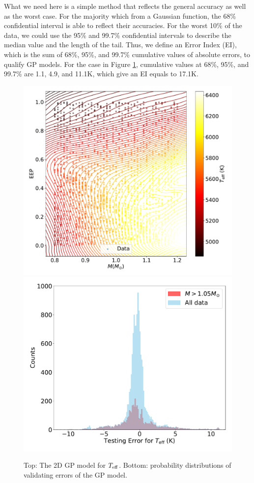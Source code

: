 %
What we need here is a simple method that reflects the general accuracy as well as the worst case.
For the majority which from a Gaussian function, the 68\% confidential interval is able to reflect their accuracies. For the worst 10\% of the data, we could use the 95\% and 99.7\% confidential intervals to describe the median value and the length of the tail. Thus, we define an Error Index (EI), which is the sum of 68\%, 95\%, and 99.7\% cumulative values of absolute errors, to qualify GP models. For the case in Figure \ref{fig:2dtest}, cumulative values at 68\%, 95\%, and 99.7\% are 1.1, 4.9, and 11.1K, which give an EI equals to 17.1K. 

\begin{figure}
	\includegraphics[width=1.0\columnwidth]{2d_GPmodel_function.pdf}
	\includegraphics[width=1.0\columnwidth]{2d_testing_hist_effective_T.pdf}	
    \caption{Top: The 2D GP model for $T_{\rm eff}$. Bottom: probability distributions of validating errors of the GP model. }  
    \label{fig:2dtest}
\end{figure}


